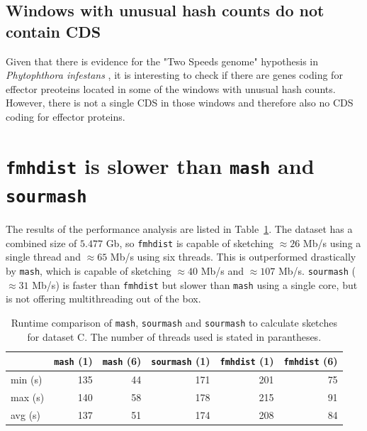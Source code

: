 \subsection*{Windows with unusual hash counts do not contain CDS}
Given that there is evidence for the "Two Speeds genome" hypothesis in
\textit{Phytophthora infestans} \cite{dongTwospeedGenomesFilamentous2015}, it is
interesting to check if there are genes coding for effector preoteins located in
some of the windows with unusual hash counts. However, there is not a single CDS
in those windows and therefore also no CDS coding for effector proteins.


\section{\texttt{fmhdist} is slower than \texttt{mash} and \texttt{sourmash}}
The results of the performance analysis are listed in
Table~\ref{ta:performance}. The dataset has a combined size of $5.477$ Gb,
so \texttt{fmhdist} is capable of sketching $\approx 26$ Mb/s using a single
thread and $\approx 65$ Mb/s using six threads. This is outperformed
drastically by \texttt{mash}, which is capable of sketching $\approx 40$ Mb/s
and $\approx 107$ Mb/s. \texttt{sourmash} ($\approx 31$ Mb/s) is faster than
\texttt{fmhdist} but slower than \texttt{mash} using a single core, but is not
offering multithreading out of the box. 

\begin{table}[]
  \centering
  \begin{tabular}{@{}lrrrrr@{}}
  \toprule
                  & \texttt{mash} (1)     & \texttt{mash} (6) & \texttt{sourmash} (1) & \texttt{fmhdist} (1) & \texttt{fmhdist} (6) \\ \midrule
  min (s) & 135                     &  44                     &  171              &  201                      & 75                         \\
  max (s) & 140                     &  58                     &  178              &  215                      & 91                         \\
  avg (s) & 137                     &  51                     &  174              &  208                      & 84                         \\ \bottomrule
  \end{tabular}
  \caption{Runtime comparison of \texttt{mash}, \texttt{sourmash} and
  \texttt{sourmash} to calculate sketches for dataset C. The number of threads used is stated in parantheses.}
  \label{ta:performance}
\end{table}

\clearpage
